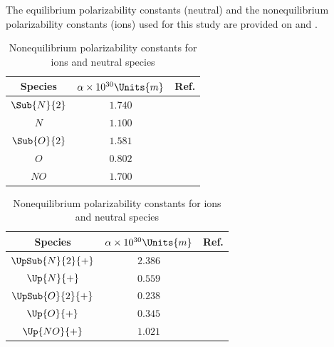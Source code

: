     The equilibrium polarizability constants (neutral) and the nonequilibrium
    polarizability constants (ions) used for this study are provided on
     and
    .
           \begin{table}[H]
               \begin{minipage}[b]{0.49\textwidth}
        	    \centering
                    \begin{tabular}{| c | c | c |}
                        \hline 
                        Species  & $\alpha \times 10^{30}\Units{m}$ & Ref.             \\
                        \hline \hline 
                        $\Sub{N}{2}$      & $1.740$                               &\cite{Haynes2004}\\
                        $N$               & $1.100$                               &\cite{Haynes2004}\\
                        $\Sub{O}{2}$      & $1.581$                               &\cite{Haynes2004}\\
                        $O$               & $0.802$                               &\cite{Haynes2004}\\
                        $NO$              & $1.700$                               &\cite{Haynes2004}\\
                        \hline 
                    \end{tabular} 
                \caption{Equilibrium polarizability constants for ions and neutral
               species\label{tab:ionizationStudyEquilibriumPolarizability}}
                \end{minipage} \hfill
               \begin{minipage}[b]{0.49\textwidth}
                   \centering
                    \begin{tabular}{| c | c | c |}
                        \hline
                        Species  & $\alpha \times 10^{30}\Units{m}$ & Ref.             \\
                        \hline\hline
                        $\UpSub{N}{2}{+}$ & $2.386$                               &\cite{McCormack1991}\\
                        $\Up{N}{+}$       & $0.559$                               &\cite{Jacobson1996}\\
                        $\UpSub{O}{2}{+}$ & $0.238$                               &\cite{Stewart1975}\\
                        $\Up{O}{+}$       & $0.345$                               &\cite{Stewart1975}\\
                        $\Up{NO}{+}$      & $1.021$                               &\cite{Feher1993}\\
                        \hline 
                    \end{tabular}
                    \caption{Nonequilibrium polarizability constants for ions and neutral
                       species\label{tab:ionizationStudyNonequilibriumPolarizability}}
               \end{minipage}
        \end{table}




